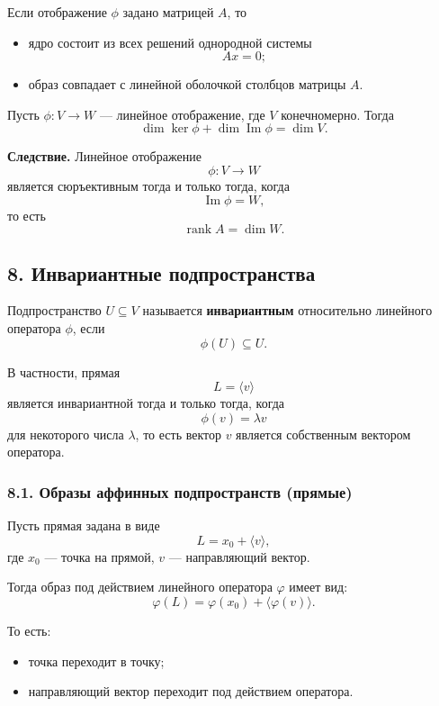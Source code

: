 \vspace{1em}

Если отображение $\phi$ задано матрицей $A$, то

\begin{itemize}
    \item ядро состоит из всех решений однородной системы
    \[
    Ax=0;
    \]
    \item образ совпадает с линейной оболочкой столбцов матрицы $A$.
\end{itemize}

\begin{theorem}
Пусть $\phi:V\to W$ — линейное отображение, где $V$ конечномерно. Тогда
\[
\dim\ker\phi+\dim\operatorname{Im}\phi=\dim V.
\]
\end{theorem}

\noindent\textbf{Следствие.}
Линейное отображение
\[
\phi:V\to W
\]
является сюръективным тогда и только тогда, когда
\[
\operatorname{Im}\phi=W,
\]
то есть
\[
\operatorname{rank}A=\dim W.
\]

\subsection*{8. Инвариантные подпространства}

\begin{definition}
Подпространство $U\subseteq V$ называется \textbf{инвариантным} относительно линейного оператора $\phi$, если
\[
\phi(U)\subseteq U.
\]
\end{definition}

В частности, прямая
\[
L=\langle v\rangle
\]
является инвариантной тогда и только тогда, когда
\[
\phi(v)=\lambda v
\]
для некоторого числа $\lambda$, то есть вектор $v$ является собственным вектором оператора.

\subsubsection*{8.1. Образы аффинных подпространств (прямые)}

Пусть прямая задана в виде
\[
L = x_0 + \langle v \rangle,
\]
где $x_0$ — точка на прямой, $v$ — направляющий вектор.

Тогда образ под действием линейного оператора $\varphi$ имеет вид:
\[
\varphi(L) = \varphi(x_0) + \langle \varphi(v) \rangle.
\]

То есть:
\begin{itemize}
    \item точка переходит в точку;
    \item направляющий вектор переходит под действием оператора.
\end{itemize}
